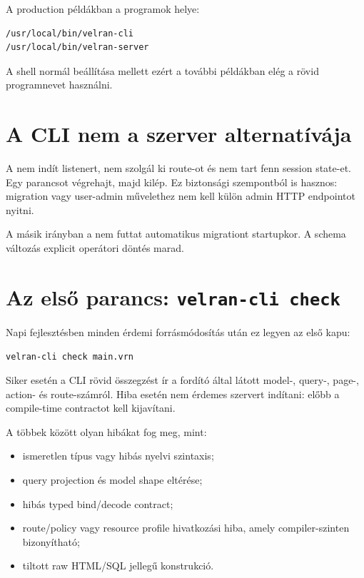 A production példákban a programok helye:

\begin{lstlisting}
/usr/local/bin/velran-cli
/usr/local/bin/velran-server
\end{lstlisting}

A shell normál  beállítása mellett ezért a további példákban elég a rövid programnevet használni.

\section{A CLI nem a szerver alternatívája}

A  nem indít listenert, nem szolgál ki route-ot és nem tart fenn session state-et. Egy parancsot végrehajt, majd kilép. Ez biztonsági szempontból is hasznos: migration vagy user-admin művelethez nem kell külön admin HTTP endpointot nyitni.

A másik irányban a  nem futtat automatikus migrationt startupkor. A schema változás explicit operátori döntés marad.

\section{Az első parancs: \texttt{velran-cli check}}

Napi fejlesztésben minden érdemi forrásmódosítás után ez legyen az első kapu:

\begin{lstlisting}
velran-cli check main.vrn
\end{lstlisting}

Siker esetén a CLI rövid összegzést ír a fordító által látott model-, query-, page-, action- és route-számról. Hiba esetén nem érdemes szervert indítani: előbb a compile-time contractot kell kijavítani.

A  többek között olyan hibákat fog meg, mint:

\begin{itemize}
  \item ismeretlen típus vagy hibás nyelvi szintaxis;
  \item query projection és model shape eltérése;
  \item hibás typed bind/decode contract;
  \item route/policy vagy resource profile hivatkozási hiba, amely compiler-szinten bizonyítható;
  \item tiltott raw HTML/SQL jellegű konstrukció.
\end{itemize}

